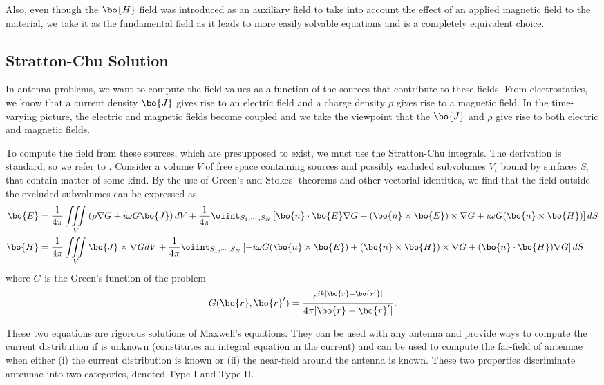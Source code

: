 Also, even though the $\bo{H}$ field was introduced as an auxiliary field to take
into account the effect of an applied magnetic field to the material, we 
take it as the fundamental field as it leads to more easily solvable
equations and is a completely equivalent choice. 

\subsection{Stratton-Chu Solution}
In antenna problems, we want to compute the field values as a function of 
the sources that contribute to these fields. From electrostatics, we know 
that a current density $\bo{J}$ gives rise to an electric field and a charge 
density $\rho$ gives rise to a magnetic field. In the time-varying picture, 
the electric and magnetic fields become coupled and we take the viewpoint that
the $\bo{J}$ and $\rho$ give rise to both electric and magnetic fields. 

To compute the field from these sources, which are presupposed to exist, 
we must use the Stratton-Chu integrals. The derivation is standard, so we 
refer to \cite{ELL2003}. Consider a volume $V$ of free space containing
sources and possibly excluded subvolumes $V_i$ bound by surfaces $S_i$ that contain matter
of some kind. By the use of Green's and Stokes' theorems and other vectorial 
identities, we find that the field outside the excluded subvolumes
can be expressed as
  \begin{align}
   \bo{E} &= \frac{1}{4\pi}\mathop{\iiint}_V \left(\rho\nabla G+i\omega G\bo{J}\right)dV
	+\frac{1}{4\pi}\oiint_{S_1,\cdots,S_N}\left[\bo{n}\cdot\bo{E}\nabla G+(\bo{n}\times\bo{E})\times\nabla G+i\omega G(\bo{n}\times\bo{H})\right]dS\label{eq:antenna.strattonChuE}\\
   \bo{H} &= \frac{1}{4\pi}\mathop{\iiint}_V \bo{J}\times\nabla G dV
	+\frac{1}{4\pi}\oiint_{S_1,\cdots,S_N}\left[-i\omega G(\bo{n}\times\bo{E})+(\bo{n}\times\bo{H})\times\nabla G+(\bo{n}\cdot\bo{H})\nabla G\right]dS\label{eq:antenna.strattonChuH}
  \end{align}
where $G$ is the Green's function of the problem
  \begin{equation}
   G(\bo{r},\bo{r}') = \frac{e^{ik|\bo{r}-\bo{r'}|}}{4\pi|\bo{r}-\bo{r}'|}.
  \end{equation}

These two equations are rigorous solutions of Maxwell's equations. 
They can be used with any antenna and provide ways to compute the 
current distribution if is unknown (constitutes an integral equation in the current)
and can be used to compute the far-field of antennae when either 
(i) the current distribution is known or (ii) the near-field around the antenna
is known. 
These two properties discriminate antennae into two categories, denoted Type I and Type II.

